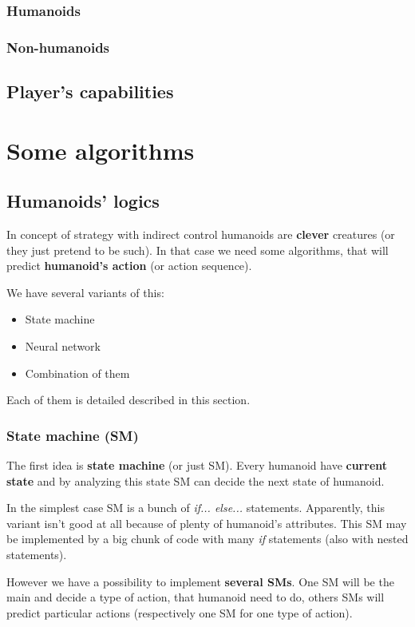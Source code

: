 \documentclass[12pt]{article}
\begin{document}
			\subsubsection{Humanoids}
			\subsubsection{Non-humanoids}
		\subsection{Player's capabilities}

	\section{Some algorithms}
		\subsection{Humanoids' logics}
			In concept of strategy with indirect control humanoids are \textbf{clever} creatures (or they just pretend to be such). In that case we need some algorithms, that will predict \textbf{humanoid's action} (or action sequence).

			We have several variants of this:
				\begin{itemize}
					\item State machine
					\item Neural network
					\item Combination of them
				\end{itemize}

			Each of them is detailed described in this section.

			\subsubsection{State machine (SM)}
				The first idea is \textbf{state machine} (or just SM). Every humanoid have \textbf{current state} and by analyzing this state SM can decide the next state of humanoid.

				In the simplest case SM is a bunch of \textit{if... else...} statements. Apparently, this variant isn't good at all because of plenty of humanoid's attributes. This SM may be implemented by a big chunk of code with many \textit{if} statements (also with nested statements).

				However we have a possibility to implement \textbf{several SMs}. One SM will be the main and decide a type of action, that humanoid need to do, others SMs will predict particular actions (respectively one SM for one type of action).
\end{document}
